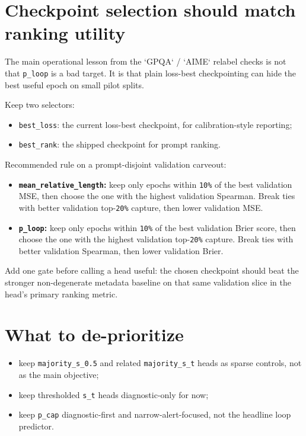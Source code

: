 \documentclass[11pt]{article}
\begin{document}
\section*{Checkpoint selection should match ranking utility}
The main operational lesson from the `GPQA` / `AIME` relabel checks is not that
\texttt{p\_loop} is a bad target. It is that plain loss-best checkpointing can hide
the best useful epoch on small pilot splits.

Keep two selectors:
\begin{itemize}[leftmargin=1.5em]
\item \texttt{best\_loss}: the current loss-best checkpoint, for calibration-style reporting;
\item \texttt{best\_rank}: the shipped checkpoint for prompt ranking.
\end{itemize}

Recommended rule on a prompt-disjoint validation carveout:
\begin{itemize}[leftmargin=1.5em]
\item \textbf{\texttt{mean\_relative\_length}:} keep only epochs within \texttt{10\%} of the
best validation MSE, then choose the one with the highest validation Spearman.
Break ties with better validation top-\texttt{20\%} capture, then lower validation MSE.
\item \textbf{\texttt{p\_loop}:} keep only epochs within \texttt{10\%} of the best
validation Brier score, then choose the one with the highest validation
top-\texttt{20\%} capture. Break ties with better validation Spearman, then lower
validation Brier.
\end{itemize}

Add one gate before calling a head useful: the chosen checkpoint should beat the
stronger non-degenerate metadata baseline on that same validation slice in the
head's primary ranking metric.

\section*{What to de-prioritize}
\begin{itemize}[leftmargin=1.5em]
\item keep \texttt{majority\_s\_0.5} and related \texttt{majority\_s\_t} heads as
sparse controls, not as the main objective;
\item keep thresholded \texttt{s\_t} heads diagnostic-only for now;
\item keep \texttt{p\_cap} diagnostic-first and narrow-alert-focused, not the
headline loop predictor.
\end{itemize}
\end{document}
